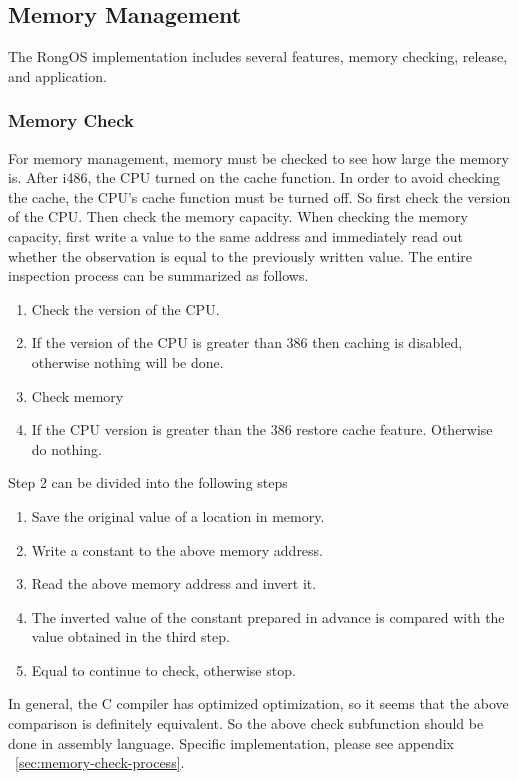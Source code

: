 \documentclass{swfcthesis}
\begin{document}
\subsection{Memory Management}
\label{sec:memory-management-2}
The RongOS implementation includes several features, memory checking, release, and
application.


\subsubsection{Memory Check}
\label{sec:memory-check}

For memory management, memory must be checked to see how large the memory is. After i486,
the CPU turned on the cache function. In order to avoid checking the cache, the CPU's
cache function must be turned off. So first check the version of the CPU. Then check the
memory capacity. When checking the memory capacity, first write a value to the same
address and immediately read out whether the observation is equal to the previously
written value. The entire inspection process can be summarized as follows.
\begin{enumerate}
\item Check the version of the CPU.
\item If the version of the CPU is greater than 386 then caching is disabled, otherwise
  nothing will be done.
  
\item Check memory
\item If the CPU version is greater than the 386 restore cache feature. Otherwise do
  nothing.
\end{enumerate}
Step 2 can be divided into the following steps
\begin{enumerate}
\item Save the original value of a location in memory.
\item Write a constant to the above memory address.
\item Read the above memory address and invert it.
\item The inverted value of the constant prepared in advance is compared with the value
  obtained in the third step.
\item Equal to continue to check, otherwise stop.
\end{enumerate}
In general, the C compiler has optimized optimization, so it seems that the above
comparison is definitely equivalent. So the above check subfunction should be done in
assembly language. Specific implementation, please see appendix
~\ref{sec:memory-check-process}.
\end{document}

